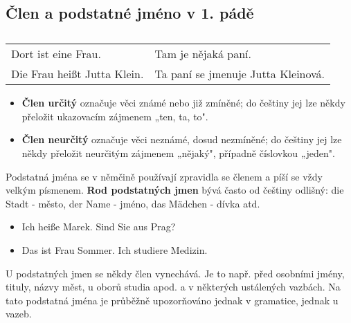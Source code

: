   \subsection*{Člen a podstatné jméno v 1. pádě}
    \begin{table}[ht!]   %
      \begin{tabular}{ll}
        Dort ist eine Frau.          & Tam je nějaká paní. \\
        Die Frau heißt Jutta Klein.  & Ta paní se jmenuje Jutta Kleinová.   \\
      \end{tabular}
      \caption*{ }
    \end{table}
    \begin{itemize}\addtolength{\itemsep}{-0.5\baselineskip}
      \item \textbf{Člen určitý} označuje věci známé nebo již zmíněné; do češtiny jej lze někdy 
            přeložit ukazovacím zájmenem „ten, ta, to".
      \item \textbf{Člen neurčitý} označuje věci neznámé, dosud nezmíněné; do češtiny jej lze 
            někdy přeložit neurčitým zájmenem „nějaký", případně číslovkou „jeden".
    \end{itemize}

    Podstatná jména se v němčině používají zpravidla se členem a píší se vždy velkým písmenem. 
    \textbf{Rod podstatných jmen} bývá často od češtiny odlišný: die Stadt - město, der Name - 
    jméno, das M{\"a}dchen - dívka atd.
    \begin{itemize}\addtolength{\itemsep}{-0.5\baselineskip} %
      \item Ich heiße Marek. Sind Sie aus Prag?
      \item Das ist Frau Sommer. Ich studiere Medizin.
    \end{itemize}
    U podstatných jmen se někdy člen vynechává. Je to např. před osobními jmény, tituly, názvy 
    měst, u oborů studia apod. a v některých ustálených vazbách. Na tato podstatná jména je 
    průběžně upozorňováno jednak v gramatice, jednak u vazeb.

